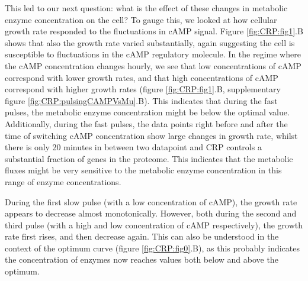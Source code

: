 This led to our next question: what is the effect of these changes in metabolic enzyme concentration on the cell? 
%
To gauge this, we looked at how cellular growth rate responded to the fluctuations in cAMP signal. 
%
Figure \ref{fig:CRP:fig1}.B shows that also the growth rate varied substantially, again suggesting the cell is susceptible to fluctuations in
the cAMP regulatory molecule. 
%
In the regime where the cAMP concentration changes hourly, 
we see that low concentrations of cAMP correspond with lower growth rates,
and that high concentrations of cAMP correspond with higher growth rates (figure \ref{fig:CRP:fig1}.B, supplementary figure \ref{fig:CRP:pulsingCAMPVsMu}.B).
%
This indicates that during the fast pulses, the metabolic enzyme concentration might be below the optimal value.
%
Additionally, during the fast pulses, the data points right before and after the time of switching cAMP concentration show large changes in growth rate,
whilst there is only 20 minutes in between two datapoint and CRP controls a substantial fraction of genes in the proteome.
This indicates that the metabolic fluxes might be very sensitive to the metabolic enzyme concentration in this range of enzyme concentrations. 
%



During the first slow pulse (with a low concentration of cAMP), the growth rate appears to decrease almost monotonically.
However, both during the second and third pulse (with a high and low concentration of cAMP respectively), 
the growth rate first rises, and then decrease again.
%
This can also be understood in the context of the optimum curve (figure \ref{fig:CRP:fig0}.B), 
as this probably indicates the concentration of enzymes now reaches values both below and above the optimum.


